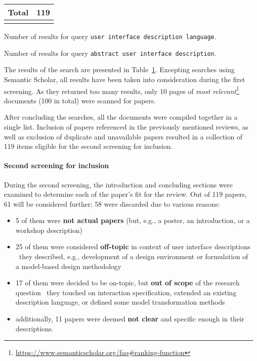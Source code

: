 \begin{table}[]
\begin{threeparttable}[b]
\begin{tabular}{@{}rrcc@{}}
            \midrule
            \multicolumn{3}{r}{\textbf{Total}} & 119 \\
            \bottomrule
            \label{tab:results-first-stage-review-rq-1}
        \end{tabular}
        \begin{tablenotes}
            \item [1] Number of results for query \texttt{user interface description language}.
            \item [2] Number of results for query \texttt{abstract user interface description}.
        \end{tablenotes}
    \end{threeparttable}
\end{table}

The results of the search are presented in Table~\ref{tab:results-first-stage-review-rq-1}.
Excepting searches using Semantic Scholar, all results have been taken into consideration during the first screening.
As they returned too many results, only 10 pages of \emph{most relevant}\footnote{\url{https://www.semanticscholar.org/faq\#ranking-function}} documents (100 in total) were scanned for papers.

After concluding the searches, all the documents were compiled together in a single list.
Inclusion of papers referenced in the previously mentioned reviews, as well as exclusion of duplicate and unavailable papers resulted in a collection of 119 items eligible for the second screening for inclusion.

\paragraph{Second screening for inclusion}

During the second screening, the introduction and concluding sections were examined to determine each of the paper's fit for the review.
Out of 119 papers, 61 will be considered further;
58 were discarded due to various reasons:
\begin{itemize}
    \item 5 of them were \textbf{not actual papers} (but, e.g., a poster, an introduction, or a workshop description)
    \item 25 of them were considered \textbf{off-topic} in context of user interface descriptions \textendash\ they described, e.g., development of a design environment or formulation of a model-based design methodology
    \item 17 of them were decided to be on-topic, but \textbf{out of scope} of the research question \textendash\ they touched on interaction specification, extended an existing description language, or defined some model transformation methods
    \item additionally, 11 papers were deemed \textbf{not clear} and specific enough in their descriptions.
\end{itemize}
